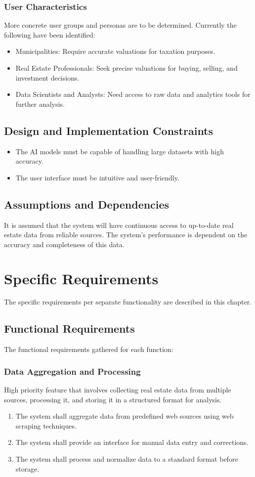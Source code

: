 \documentclass[12pt]{article}
\begin{document}
\subsubsection{User Characteristics}
More concrete user groups and personas are to be determined. Currently the following have been identified:
\begin{itemize}
    \item Municipalities: Require accurate valuations for taxation purposes.
    \item Real Estate Professionals: Seek precise valuations for buying, selling, and investment decisions.
    \item Data Scientists and Analysts: Need access to raw data and analytics tools for further analysis.
\end{itemize}

\subsection{Design and Implementation Constraints}
\begin{itemize}
    \item The AI models must be capable of handling large datasets with high accuracy.
    \item The user interface must be intuitive and user-friendly.
\end{itemize}

\subsection{Assumptions and Dependencies}
It is assumed that the system will have continuous access to up-to-date real estate data from reliable sources. The system's performance is dependent on the accuracy and completeness of this data.

\newpage

\section{Specific Requirements}
The specific requirements per separate functionality are described in this chapter.
\subsection{Functional Requirements}
The functional requirements gathered for each function:
\subsubsection{Data Aggregation and Processing}
High priority feature that involves collecting real estate data from multiple sources, processing it, and storing it in a structured format for analysis.
\begin{enumerate}
    \item  The system shall aggregate data from predefined web sources using web scraping techniques.
    \item The system shall provide an interface for manual data entry and corrections.
    \item The system shall process and normalize data to a standard format before storage.
\end{enumerate}
\end{document}
